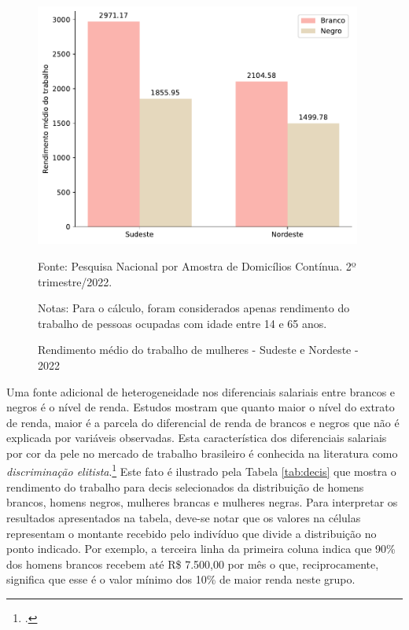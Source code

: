 \documentclass[12pt]{article}
\begin{document}
\begin{figure}[H]
    \centering
    \caption{Rendimento médio do trabalho de mulheres - Sudeste e Nordeste - 2022}
        \includegraphics[height=8cm]{../figures/wage_2002_region_women.pdf}
    \label{fig:rendimento_regiao_sexo}
    \begin{floatnotes}
        \item[Fonte:] Pesquisa Nacional por Amostra de Domicílios Contínua. 2º trimestre/2022.
        \item[Notas:] Para o cálculo, foram considerados apenas rendimento do trabalho de pessoas ocupadas com idade entre 14 e 65 anos.
    \end{floatnotes}
\end{figure}

\par Uma fonte adicional de heterogeneidade nos diferenciais salariais entre brancos e negros é o nível de renda. Estudos mostram que quanto maior o nível do extrato de renda, maior é a parcela do diferencial de renda de brancos e negros que não é explicada por variáveis observadas. Esta característica dos diferenciais salariais por cor da pele no mercado de trabalho brasileiro é conhecida na literatura como \textit{discriminação elitista}.\footcite{soares2000perfil,campante2004desigualdade} Este fato é ilustrado pela Tabela \ref{tab:decis} que mostra o rendimento do trabalho para decis selecionados da distribuição de homens brancos, homens negros, mulheres brancas e mulheres negras. Para interpretar os resultados apresentados na tabela, deve-se notar que os valores na células representam o montante recebido pelo indivíduo que divide a distribuição no ponto indicado. Por exemplo, a terceira linha da primeira coluna indica que 90\% dos homens brancos recebem até R\$ 7.500,00 por mês o que, reciprocamente, significa que esse é o valor mínimo dos 10\% de maior renda neste grupo.
\end{document}

